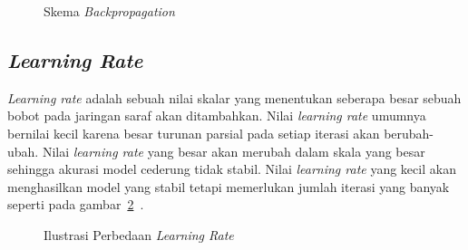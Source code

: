 \begin{figure}[htbp]
    \begin{center}
    \end{center}
    \vspace{-20pt}
    \captionsetup{labelfont=bf, textfont=bf}
    \caption{Skema \textit{Backpropagation}}
    \vspace{-10pt}
    \captionsetup{labelfont=md, textfont=md}
    \label{fig:backprop}
\end{figure}

\subsection{\textit{Learning Rate}}

\textit{Learning rate} adalah sebuah nilai skalar yang menentukan seberapa besar sebuah bobot pada
jaringan saraf akan ditambahkan. Nilai \textit{learning rate} umumnya bernilai kecil karena
besar turunan parsial pada setiap iterasi akan berubah-ubah. Nilai \textit{learning rate} yang besar
akan merubah dalam skala yang besar sehingga akurasi model cederung tidak stabil. Nilai
\textit{learning rate} yang kecil akan menghasilkan model yang stabil tetapi memerlukan jumlah iterasi
yang banyak seperti pada gambar~\ref{fig:backprop}~\cite{2019arXiv190801878Y}.

\begin{figure}[htbp]
    \begin{center}
    \end{center}
    \vspace{-20pt}
    \captionsetup{labelfont=bf, textfont=bf}
    \caption{Ilustrasi Perbedaan \textit{Learning Rate}}
    \vspace{-10pt}
    \captionsetup{labelfont=md, textfont=md}
    \label{fig:backprop}
\end{figure}

